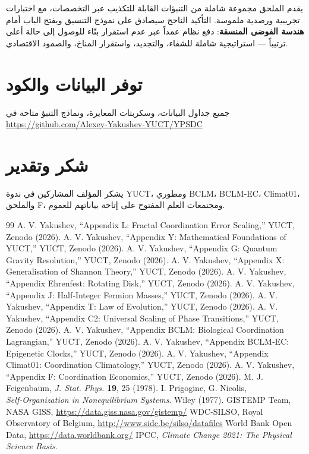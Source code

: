 \documentclass[12pt,a4paper]{article}
\begin{document}
	يقدم الملحق مجموعة شاملة من التنبؤات القابلة للتكذيب عبر التخصصات، مع اختبارات تجريبية ورصدية ملموسة. التأكيد الناجح سيصادق على نموذج التنسيق ويفتح الباب أمام \textbf{هندسة الفوضى المنسقة}: دفع نظام عمداً عبر عدم استقرار بنّاء للوصول إلى حالة أعلى ترتيباً — استراتيجية شاملة للشفاء، والتجديد، واستقرار المناخ، والصمود الاقتصادي.
	
	\section*{توفر البيانات والكود}
	جميع جداول البيانات، وسكربتات المعايرة، ونماذج التنبؤ متاحة في \url{https://github.com/Alexey-Yakushev-YUCT/YPSDC}
	
	\section*{شكر وتقدير}
	يشكر المؤلف المشاركين في ندوة YUCT، ومطوري BCLM، BCLM‑EC، Climat01، والملحق F، ومجتمعات العلم المفتوح على إتاحة بياناتهم للعموم.
	
	\begin{thebibliography}{99}
		 A. V. Yakushev, ``Appendix L: Fractal Coordination Error Scaling,'' YUCT, Zenodo (2026).
		 A. V. Yakushev, ``Appendix Y: Mathematical Foundations of YUCT,'' YUCT, Zenodo (2026).
		 A. V. Yakushev, ``Appendix G: Quantum Gravity Resolution,'' YUCT, Zenodo (2026).
		 A. V. Yakushev, ``Appendix X: Generalisation of Shannon Theory,'' YUCT, Zenodo (2026).
		 A. V. Yakushev, ``Appendix Ehrenfest: Rotating Disk,'' YUCT, Zenodo (2026).
		 A. V. Yakushev, ``Appendix J: Half‑Integer Fermion Masses,'' YUCT, Zenodo (2026).
		 A. V. Yakushev, ``Appendix T: Law of Evolution,'' YUCT, Zenodo (2026).
		 A. V. Yakushev, ``Appendix C2: Universal Scaling of Phase Transitions,'' YUCT, Zenodo (2026).
		 A. V. Yakushev, ``Appendix BCLM: Biological Coordination Lagrangian,'' YUCT, Zenodo (2026).
		 A. V. Yakushev, ``Appendix BCLM‑EC: Epigenetic Clocks,'' YUCT, Zenodo (2026).
		 A. V. Yakushev, ``Appendix Climat01: Coordination Climatology,'' YUCT, Zenodo (2026).
		 A. V. Yakushev, ``Appendix F: Coordination Economics,'' YUCT, Zenodo (2026).
		 M. J. Feigenbaum, \emph{J. Stat. Phys.} \textbf{19}, 25 (1978).
		 I. Prigogine, G. Nicolis, \emph{Self‑Organization in Nonequilibrium Systems}. Wiley (1977).
		 GISTEMP Team, NASA GISS, \url{https://data.giss.nasa.gov/gistemp/}
		 WDC‑SILSO, Royal Observatory of Belgium, \url{http://www.sidc.be/silso/datafiles}
		 World Bank Open Data, \url{https://data.worldbank.org/}
		 IPCC, \emph{Climate Change 2021: The Physical Science Basis}.
	\end{thebibliography}
	
\end{document}
